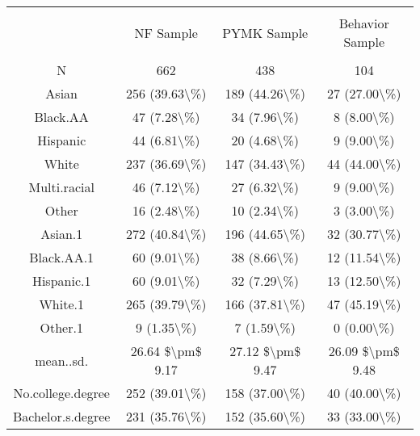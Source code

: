 
\begin{table}[!htbp] \centering 
  \caption{} 
  \label{} 
\begin{tabular}{@{\extracolsep{5pt}} cccc} 
\\[-1.8ex]\hline 
\hline \\[-1.8ex] 
 & NF Sample & PYMK Sample & Behavior Sample \\ 
\hline \\[-1.8ex] 
N & 662 & 438 & 104 \\ 
Asian & 256 (39.63\textbackslash \%) & 189 (44.26\textbackslash \%) & 27 (27.00\textbackslash \%) \\ 
Black.AA & 47 (7.28\textbackslash \%) & 34 (7.96\textbackslash \%) & 8 (8.00\textbackslash \%) \\ 
Hispanic & 44 (6.81\textbackslash \%) & 20 (4.68\textbackslash \%) & 9 (9.00\textbackslash \%) \\ 
White & 237 (36.69\textbackslash \%) & 147 (34.43\textbackslash \%) & 44 (44.00\textbackslash \%) \\ 
Multi.racial & 46 (7.12\textbackslash \%) & 27 (6.32\textbackslash \%) & 9 (9.00\textbackslash \%) \\ 
Other & 16 (2.48\textbackslash \%) & 10 (2.34\textbackslash \%) & 3 (3.00\textbackslash \%) \\ 
Asian.1 & 272 (40.84\textbackslash \%) & 196 (44.65\textbackslash \%) & 32 (30.77\textbackslash \%) \\ 
Black.AA.1 & 60 (9.01\textbackslash \%) & 38 (8.66\textbackslash \%) & 12 (11.54\textbackslash \%) \\ 
Hispanic.1 & 60 (9.01\textbackslash \%) & 32 (7.29\textbackslash \%) & 13 (12.50\textbackslash \%) \\ 
White.1 & 265 (39.79\textbackslash \%) & 166 (37.81\textbackslash \%) & 47 (45.19\textbackslash \%) \\ 
Other.1 & 9 (1.35\textbackslash \%) & 7 (1.59\textbackslash \%) & 0 (0.00\textbackslash \%) \\ 
mean..sd. & 26.64 \$\textbackslash pm\$ 9.17 & 27.12 \$\textbackslash pm\$ 9.47 & 26.09 \$\textbackslash pm\$ 9.48 \\ 
No.college.degree & 252 (39.01\textbackslash \%) & 158 (37.00\textbackslash \%) & 40 (40.00\textbackslash \%) \\ 
Bachelor.s.degree & 231 (35.76\textbackslash \%) & 152 (35.60\textbackslash \%) & 33 (33.00\textbackslash \%) \\ 

\end{tabular}
\end{table}
